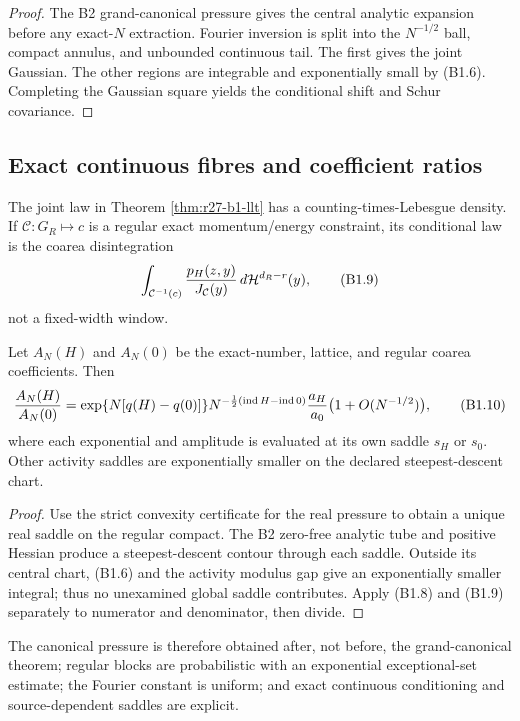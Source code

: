\begin{proof}
The B2 grand-canonical pressure gives the central analytic expansion before
any exact-$N$ extraction.  Fourier inversion is split into the
$N^{-1/2}$ ball, compact annulus, and unbounded continuous tail.  The first
gives the joint Gaussian.  The other regions are integrable and exponentially
small by (B1.6).  Completing the Gaussian square yields the conditional shift
and Schur covariance.
\end{proof}

\subsection{Exact continuous fibres and coefficient ratios}

The joint law in Theorem \ref{thm:r27-b1-llt} has a counting-times-Lebesgue
density.  If $\mathcal C:G_R\mapsto c$ is a regular exact momentum/energy
constraint, its conditional law is the coarea disintegration
\[
 \int_{\mathcal C^{-1}(c)}
 {p_H(z,y)\over J_{\mathcal C}(y)}\,d\mathcal H^{d_R-r}(y),              \tag{B1.9}
\]
not a fixed-width window.

\begin{theorem}
\label{thm:r27-b1-ratio}
Let $A_N(H)$ and $A_N(0)$ be the exact-number, lattice, and regular coarea
coefficients.  Then
\[
 {A_N(H)\over A_N(0)}
 =\exp\{N[q(H)-q(0)]\}
  N^{-\frac12(\operatorname{ind}H-\operatorname{ind}0)}
  {a_H\over a_0}\bigl(1+O(N^{-1/2})\bigr),                \tag{B1.10}
\]
where each exponential and amplitude is evaluated at its own saddle
$s_H$ or $s_0$.  Other activity saddles are exponentially smaller on the
declared steepest-descent chart.
\end{theorem}

\begin{proof}
Use the strict convexity certificate for the real pressure to obtain a unique
real saddle on the regular compact.  The B2 zero-free analytic tube and
positive Hessian produce a steepest-descent contour through each saddle.
Outside its central chart, (B1.6) and the activity modulus gap give an
exponentially smaller integral; thus no unexamined global saddle contributes.
Apply (B1.8) and (B1.9) separately to numerator and denominator, then divide.
\end{proof}

The canonical pressure is therefore obtained after, not before, the
grand-canonical theorem; regular blocks are probabilistic with an exponential
exceptional-set estimate; the Fourier constant is uniform; and exact
continuous conditioning and source-dependent saddles are explicit.

